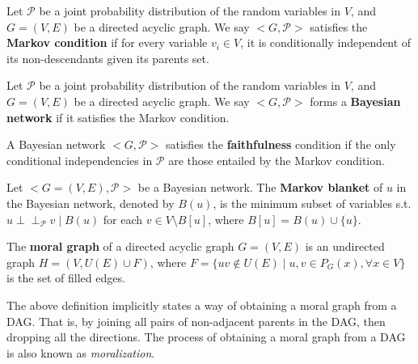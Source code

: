 \begin{definition}
\label{def:markov}
Let $\mathcal{P}$ be a joint probability distribution of the random variables in $V$, and $G=(V,E)$ be a directed acyclic graph. We say $<G, \mathcal{P}>$ satisfies the \textbf{Markov condition} if for every variable $v_i \in V$, it is conditionally independent of its non-descendants  given its parents set.
\end{definition}

\begin{definition}
\label{def:bn}
Let $\mathcal{P}$ be a joint probability distribution of the random variables in $V$, and $G=(V,E)$ be a directed acyclic graph. We say $<G, \mathcal{P}>$ forms a \textbf{Bayesian network} if it satisfies the Markov condition. 
\end{definition}

\begin{definition}
A Bayesian network $<G, \mathcal{P}>$ satisfies the \textbf{faithfulness} condition if the only conditional independencies in $\mathcal{P}$ are those entailed by the Markov condition. 
\end{definition}

\begin{definition}
\label{def:mb}
Let $<G=(V,E),\mathcal{P}>$ be a Bayesian network. The \textbf{Markov blanket} of $u$ in the Bayesian network, denoted by $B(u)$, is the minimum subset of variables s.t. $u \!\perp\!\!\!\perp_{\mathcal{P}} v \mid B(u)$ for each $v \in V\setminus B[u]$, where $B[u]=B(u)\cup \{u\}$.
\end{definition}

\iffalse
\begin{definition}
\label{def:skeleton}
The \textbf{skeleton} of a hybrid graph is the undirected graph obtained by dropping directions of all directed edges. 
\end{definition} 
\fi

\begin{definition}
\label{def:moral_g}
The \textbf{moral graph} of a directed acyclic graph $G=(V,E)$ is an undirected graph $H=(V,U(E) \cup F)$, where $F=\{uv \notin U(E) \mid u,v \in P_G(x),\forall x\in V\}$ is the set of filled edges. 
\end{definition}
The above definition implicitly states a way of obtaining a moral graph from a DAG. That is, by joining all pairs of non-adjacent parents in the DAG, then dropping all the directions. The process of obtaining a moral graph from a DAG is also known as \textit{moralization}. 

